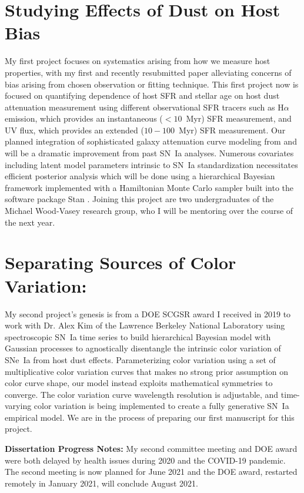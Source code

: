 \documentclass[modern]{aastex63}
\begin{document}
\section{Studying Effects of Dust on Host Bias}
My first project focuses on systematics arising from how we measure host properties, with my first and recently resubmitted paper alleviating concerns of bias arising from chosen observation or fitting technique.  This first project now is focused on quantifying dependence of host SFR and stellar age on host dust attenuation measurement using different observational SFR tracers such as H$\alpha$ emission, which provides an instantaneous ($<10$~Myr) SFR measurement, and UV flux, which provides an extended ($10-100$~Myr) SFR measurement. 
Our planned integration of sophisticated galaxy attenuation curve modeling from \cite{Salim2018} and \cite{Narayanan2018} will be a dramatic improvement from past SN~Ia analyses.
Numerous covariates including latent model parameters intrinsic to SN~Ia standardization necessitates efficient posterior analysis which will be done using a hierarchical Bayesian framework implemented with a Hamiltonian Monte Carlo sampler built into the software package Stan \cite{STAN}.
Joining this project are two undergraduates of the Michael Wood-Vasey research group, who I will be mentoring over the course of the next year.

\section{Separating Sources of Color Variation:}
My second project's genesis is from a DOE SCGSR award I received in 2019 to work with Dr. Alex Kim of the Lawrence Berkeley National Laboratory using spectroscopic SN~Ia time series to build hierarchical Bayesian model with Gaussian processes to agnostically disentangle the intrinsic color variation of SNe~Ia from host dust effects.
Parameterizing color variation using a set of multiplicative color variation curves that makes no strong prior assumption on color curve shape, our model instead exploits mathematical symmetries to converge.
The color variation curve wavelength resolution is adjustable, and time-varying color variation is being implemented to create a fully generative SN~Ia empirical model.
We are in the process of preparing our first manuscript for this project.

{\bf Dissertation Progress Notes:}
My second committee meeting and DOE award were both delayed by health issues during 2020 and the COVID-19 pandemic. 
The second meeting is now planned for June 2021 and the DOE award, restarted remotely in January 2021, will conclude August 2021. 

\newpage


\end{document}
